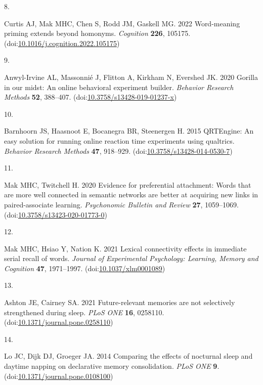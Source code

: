 \documentclass[
]{article}
\newlength{\cslhangindent}
\newlength{\csllabelwidth}
\newlength{\cslentryspacingunit} %
\newenvironment{CSLReferences}[2] %
 {%
  \setlength{\parindent}{0pt}
  \ifodd #1
  \let\oldpar\par
  \def\par{\hangindent=\cslhangindent\oldpar}
  \fi
  \setlength{\parskip}{#2\cslentryspacingunit}
 }%
 {}
\newcommand{\CSLLeftMargin}[1]{\parbox[t]{\csllabelwidth}{#1}}
\newcommand{\CSLRightInline}[1]{\parbox[t]{\linewidth - \csllabelwidth}{#1}\break}
\begin{document}
\begin{CSLReferences}{0}{0}
\leavevmode{}%
\CSLLeftMargin{8. }%
\CSLRightInline{Curtis AJ, Mak MHC, Chen S, Rodd JM, Gaskell MG. 2022 Word-meaning priming extends beyond homonyms. \emph{Cognition} \textbf{226}, 105175. (doi:\href{https://doi.org/10.1016/j.cognition.2022.105175}{10.1016/j.cognition.2022.105175})}

\leavevmode{}%
\CSLLeftMargin{9. }%
\CSLRightInline{Anwyl-Irvine AL, Massonnié J, Flitton A, Kirkham N, Evershed JK. 2020 Gorilla in our midst: An online behavioral experiment builder. \emph{Behavior Research Methods} \textbf{52}, 388--407. (doi:\href{https://doi.org/10.3758/s13428-019-01237-x}{10.3758/s13428-019-01237-x})}

\leavevmode{}%
\CSLLeftMargin{10. }%
\CSLRightInline{Barnhoorn JS, Haasnoot E, Bocanegra BR, Steenergen H. 2015 QRTEngine: An easy solution for running online reaction time experiments using qualtrics. \emph{Behavior Research Methods} \textbf{47}, 918--929. (doi:\href{https://doi.org/10.3758/s13428-014-0530-7}{10.3758/s13428-014-0530-7})}

\leavevmode{}%
\CSLLeftMargin{11. }%
\CSLRightInline{Mak MHC, Twitchell H. 2020 Evidence for preferential attachment: Words that are more well connected in semantic networks are better at acquiring new links in paired-associate learning. \emph{Psychonomic Bulletin and Review} \textbf{27}, 1059--1069. (doi:\href{https://doi.org/10.3758/s13423-020-01773-0}{10.3758/s13423-020-01773-0})}

\leavevmode{}%
\CSLLeftMargin{12. }%
\CSLRightInline{Mak MHC, Hsiao Y, Nation K. 2021 Lexical connectivity effects in immediate serial recall of words. \emph{Journal of Experimental Psychology: Learning, Memory and Cognition} \textbf{47}, 1971--1997. (doi:\href{https://doi.org/10.1037/xlm0001089}{10.1037/xlm0001089})}

\leavevmode{}%
\CSLLeftMargin{13. }%
\CSLRightInline{Ashton JE, Cairney SA. 2021 Future-relevant memories are not selectively strengthened during sleep. \emph{PLoS ONE} \textbf{16}, 0258110. (doi:\href{https://doi.org/10.1371/journal.pone.0258110}{10.1371/journal.pone.0258110})}

\leavevmode{}%
\CSLLeftMargin{14. }%
\CSLRightInline{Lo JC, Dijk DJ, Groeger JA. 2014 Comparing the effects of nocturnal sleep and daytime napping on declarative memory consolidation. \emph{PLoS ONE} \textbf{9}. (doi:\href{https://doi.org/10.1371/journal.pone.0108100}{10.1371/journal.pone.0108100})}


\end{CSLReferences}
\end{document}
